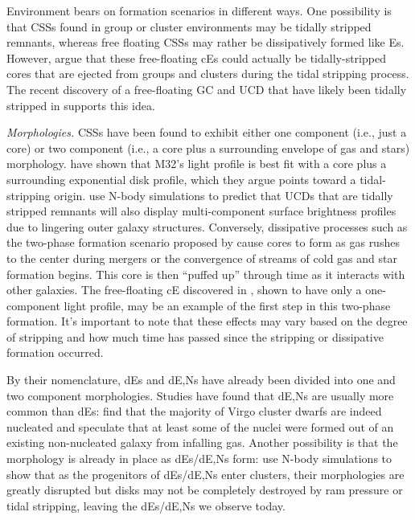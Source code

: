 \documentclass[iop,apj]{emulateapj}
\begin{document}
Environment bears on formation scenarios in different ways. One possibility is that CSSs found in group or cluster environments may be tidally stripped remnants, whereas free floating CSSs may rather be dissipatively formed like Es. However, \citet{Chilingarian2015} argue that these free-floating cEs could actually be tidally-stripped cores that are ejected from groups and clusters during the tidal stripping process. The recent discovery of a free-floating GC and UCD that have likely been tidally stripped in \citet{Sandoval2015} supports this idea.

\textit{Morphologies.} CSSs have been found to exhibit either one component (i.e., just a core) or two component (i.e., a core plus a surrounding envelope of gas and stars) morphology. \citet{Graham2002} have shown that M32's light profile is best fit with a core plus a surrounding exponential disk profile, which they argue points toward a tidal-stripping origin. \citet{Pfeffer2013} use N-body simulations to predict that UCDs that are tidally stripped remnants will also display multi-component surface brightness profiles due to lingering outer galaxy structures. Conversely, dissipative processes such as the two-phase formation scenario proposed by \citet{Oser2010} cause cores to form as gas rushes to the center during mergers or the convergence of streams of cold gas and star formation begins. This core is then ``puffed up'' through time as it interacts with other galaxies. The free-floating cE discovered in \citet{Huxor2013}, shown to have only a one-component light profile, may be an example of the first step in this two-phase formation. It's important to note that these effects may vary based on the degree of stripping and how much time has passed since the stripping or dissipative formation occurred.

By their nomenclature, dEs and dE,Ns have already been divided into one and two component morphologies. Studies have found that dE,Ns are usually more common than dEs: \citet{Grant2005} find that the majority of Virgo cluster dwarfs are indeed nucleated and speculate that at least some of the nuclei were formed out of an existing non-nucleated galaxy from infalling gas. Another possibility is that the morphology is already in place as dEs/dE,Ns form: \citet{Mastropietro2005a} use N-body simulations to show that as the progenitors of dEs/dE,Ns enter clusters, their morphologies are greatly disrupted but disks may not be completely destroyed by ram pressure or tidal stripping, leaving the dEs/dE,Ns we observe today.
\end{document}
